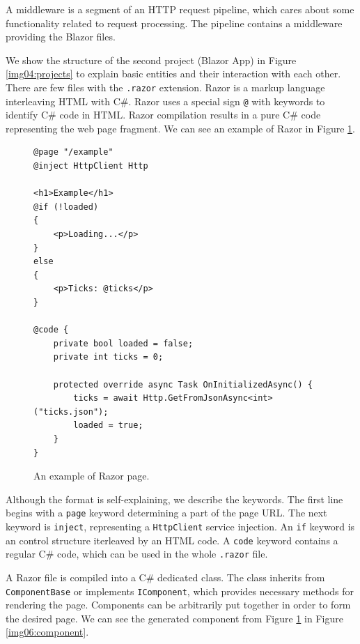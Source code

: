 A middleware is a segment of an HTTP request pipeline, which cares about some functionality related to request processing.
The pipeline contains a middleware providing the Blazor files.
\par
We show the structure of the second project (Blazor App) in Figure \ref{img04:projects} to explain basic entities and their interaction with each other.
There are few files with the \texttt{.razor} extension.
Razor is a markup language interleaving HTML with C\#.
Razor uses a special sign \texttt{@} with keywords to identify C\# code in HTML.
Razor compilation results in a pure C\# code representing the web page fragment.
We can see an example of Razor in Figure \ref{img05:razor}.
\par
\begin{figure}
\begin{lstlisting}
@page "/example"
@inject HttpClient Http

<h1>Example</h1>
@if (!loaded)
{
    <p>Loading...</p>
}
else
{
    <p>Ticks: @ticks</p>
}

@code {
    private bool loaded = false;
    private int ticks = 0;

    protected override async Task OnInitializedAsync() {
        ticks = await Http.GetFromJsonAsync<int>("ticks.json");
        loaded = true;
    }
}
\end{lstlisting}
\caption{An example of Razor page.}
\label{img05:razor}
\end{figure}
\par
Although the format is self-explaining, we describe the keywords.
The first line begins with a \texttt{page} keyword determining a part of the page URL.
The next keyword is \texttt{inject}, representing a \texttt{HttpClient} service injection. 
An \texttt{if} keyword is an control structure iterleaved by an HTML code.
A \texttt{code} keyword contains a regular C\# code, which can be used in the whole \texttt{.razor} file.
\par
A Razor file is compiled into a C\# dedicated class.
The class inherits from \texttt{ComponentBase} or implements \texttt{IComponent}, which provides necessary methods for rendering the page.
Components can be arbitrarily put together in order to form the desired page.
We can see the generated component from Figure \ref{img05:razor} in Figure \ref{img06:component}.
\par
